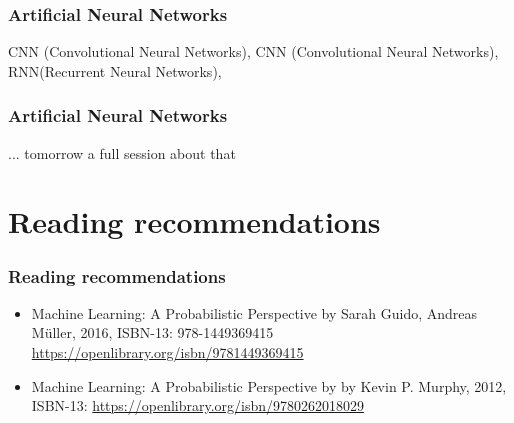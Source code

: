 \documentclass[aspectratio=169]{beamer}
\begin{document}
\begin{frame}
  \frametitle{Artificial Neural Networks}
  \begin{center}
    CNN (Convolutional Neural Networks), CNN (Convolutional Neural
    Networks), RNN(Recurrent Neural Networks), 
  \end{center}  
\end{frame}


\begin{frame}
  \frametitle{Artificial Neural Networks}
  \begin{center}
    ... tomorrow a full session about that 
  \end{center}  
\end{frame}

\section{Reading recommendations}

\setcounter{tocdepth}{1}
\begin{frame}{}
   \tableofcontents[currentsection]
\end{frame}

\begin{frame}
  \frametitle{Reading recommendations}
  \begin{block}{}
    \begin{center}
      \begin{itemize}
      \item Machine Learning: A Probabilistic Perspective by Sarah
        Guido, Andreas Müller, 2016, ISBN-13: 978-1449369415
        \href{978-0262018029}{https://openlibrary.org/isbn/9781449369415}
      \item Machine Learning: A Probabilistic Perspective by by Kevin
        P. Murphy, 2012, ISBN-13:
        \href{978-0262018029}{https://openlibrary.org/isbn/9780262018029}
      \end{itemize}
    \end{center}
  \end{block}
\end{frame}
\end{document}
